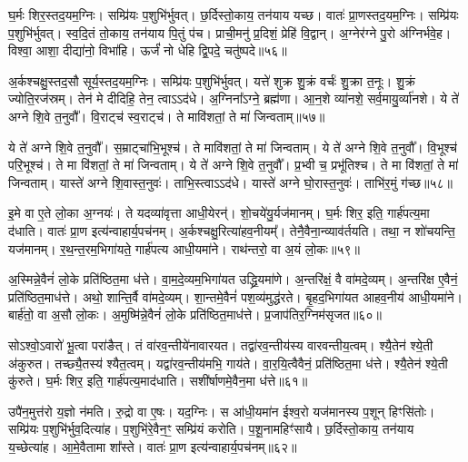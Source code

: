 घ॒र्मः शिर॒स्तद॒यम॒ग्निः।
सम्प्रि॑यः प॒शुभि॑र्भुवत्।
छ॒र्दिस्तो॒काय॒ तन॑याय यच्छ।
वातः॑ प्रा॒णस्तद॒यम॒ग्निः।
सम्प्रि॑यः प॒शुभि॑र्भुवत्।
स्व॒दि॒तं तो॒काय॒ तन॑याय पि॒तुं प॑च।
प्राची॒मनु॑ प्र॒दिशं॒ प्रेहि॑ वि॒द्वान्।
अ॒ग्नेर॑ग्ने पु॒रो अ॑ग्निर्भवे॒ह।
विश्वा॒ आशा॒ दीद्या॑नो॒ विभा॑हि।
ऊर्जं॑ नो धेहि द्वि॒पदे॒ चतु॑ष्पदे॥५६॥

अ॒र्कश्चक्षु॒स्तद॒सौ सूर्य॒स्तद॒यम॒ग्निः।
सम्प्रि॑यः प॒शुभि॑र्भुवत्।
यत्ते॑ शुक्र शु॒क्रं वर्चः॑ शु॒क्रा त॒नूः।
शु॒क्रं ज्योति॒रज॑स्रम्।
तेन॑ मे दीदिहि॒ तेन॒ त्वाऽऽद॑धे।
अ॒ग्निना᳚\-ऽग्ने॒ ब्रह्म॑णा।
आ॒न॒शे व्या॑नशे॒ सर्व॒मायु॒र्व्या॑नशे।
ये ते॑ अग्ने शि॒वे त॒नुवौ᳚।
वि॒राट्च॑ स्व॒राट्च॑।
ते मावि॑शतां॒ ते मा॑ जिन्वताम्॥५७॥

ये ते॑ अग्ने शि॒वे त॒नुवौ᳚।
स॒म्राट्चा॑भि॒भूश्च॑।
ते मावि॑शतां॒ ते मा॑ जिन्वताम्।
ये ते॑ अग्ने शि॒वे त॒नुवौ᳚।
वि॒भूश्च॑ परि॒भूश्च॑।
ते मा वि॑शतां॒ ते मा॑ जिन्वताम्।
ये ते॑ अग्ने शि॒वे त॒नुवौ᳚।
प्र॒भ्वी च॒ प्रभू॑तिश्च।
ते मा वि॑शतां॒ ते मा॑ जिन्वताम्।
यास्ते॑ अग्ने शि॒वास्त॒नुवः॑।
ताभि॒स्त्वाऽऽद॑धे।
यास्ते॑ अग्ने घो॒रास्त॒नुवः॑।
ताभि॑र॒मुं ग॑च्छ॥५८॥\anuvakamend[चतु॑ष्पदे जिन्वतां त॒नुव॒स्त्रीणि॑ च]

इ॒मे वा ए॒ते लो॒का अ॒ग्नयः॑।
ते यदव्या॑वृत्ता आधी॒येरन्॑।
शो॒चये॑यु॒र्यज॑मानम्।
घ॒र्मः शिर॒ इति॒ गार्\mbox{}ह॑पत्य॒मा द॑धाति।
वातः॑ प्रा॒ण इत्य॑न्वाहार्य॒पच॑नम्।
अ॒र्कश्चक्षु॒रित्या॑हव॒नीयम्᳚।
तेनै॒वै\-ना॒न्व्या\-व॑र्तयति।
तथा॒ न शो॑चयन्ति॒ यज॑मानम्।
र॒थ॒न्त॒रम॒भिगा॑यते॒ गार्\mbox{}ह॑पत्य आधी॒यमा॑ने।
राथ॑न्तरो॒ वा अ॒यं लो॒कः॥५९॥

अ॒स्मिन्ने॒वैनं॑ लो॒के प्रति॑\-ष्ठित॒मा ध॑त्ते।
वा॒म॒दे॒व्यम॒भिगा॑यत उद्ध्रि॒यमा॑णे।
अ॒न्तरि॑क्षं॒ वै वा॑मदे॒व्यम्।
अ॒न्तरि॑क्ष ए॒वैनं॒ प्रति॑\-ष्ठित॒माध॑त्ते।
अथो॒ शान्ति॒र्वै वा॑मदे॒व्यम्।
शा॒न्तमे॒वैनं॑ पश॒व्य॑मुद्ध॑रते।
बृ॒हद॒भिगा॑यत आहव॒नीय॑ आधी॒यमा॑ने।
बार्\mbox{}ह॑तो॒ वा अ॒सौ लो॒कः।
अ॒मुष्मि॑न्ने॒वैनं॑ लो॒के प्रति॑\-ष्ठित॒माध॑त्ते।
प्र॒जा\-प॑तिर॒ग्निम॑\-सृजत॥६०॥

सोऽश्वो॒\-ऽवारो॑ भू॒त्वा परा॑ङैत्।
तं वा॑रव॒न्तीये॑नावारयत।
तद्वा॑रव॒न्तीय॑स्य वारवन्तीय॒त्वम्।
श्यै॒तेन॑ श्ये॒ती अ॑कुरुत।
तच्छ्यै॒तस्य॑ श्यैत॒त्वम्।
यद्वा॑रव॒न्तीय॑मभि॒ गाय॑ते।
वा॒र॒यि॒त्वैवैनं॒ प्रति॑\-ष्ठित॒मा ध॑त्ते।
श्यै॒तेन॑ श्ये॒ती कु॑रुते।
घ॒र्मः शिर॒ इति॒ गार्\mbox{}ह॑पत्य॒माद॑धाति।
सशी॑र्\mbox{}षाणमे॒वैन॒मा ध॑त्ते॥६१॥

उपै॑न॒मुत्त॑रो य॒ज्ञो न॑मति।
रु॒द्रो वा ए॒षः।
यद॒ग्निः।
स आ॑धी॒यमा॑न ईश्व॒रो यज॑मानस्य प॒शून् हिꣳसि॑तोः।
सम्प्रि॑यः प॒शुभि॑र्भुव॒दित्या॑ह।
प॒शुभि॑रे॒वैन॒ꣳ॒ सम्प्रि॑यं करोति।
प॒शू॒नामहिꣳ॑सायै।
छ॒र्दिस्तो॒काय॒ तन॑याय य॒च्छेत्या॑ह।
आ॒\-मे॒वैतामा शा᳚स्ते।
वातः॑ प्रा॒ण इत्य॑न्वाहार्य॒पच॑नम्॥६२॥

